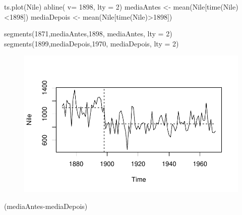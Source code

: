 \documentclass[
  letterpaper,
  DIV=11,
  numbers=noendperiod]{scrartcl}
\newenvironment{Shaded}{\begin{snugshade}}{\end{snugshade}}
\newcommand{\AttributeTok}[1]{\textcolor[rgb]{0.40,0.45,0.13}{#1}}
\newcommand{\DecValTok}[1]{\textcolor[rgb]{0.68,0.00,0.00}{#1}}
\newcommand{\FunctionTok}[1]{\textcolor[rgb]{0.28,0.35,0.67}{#1}}
\newcommand{\NormalTok}[1]{\textcolor[rgb]{0.00,0.23,0.31}{#1}}
\newcommand{\OtherTok}[1]{\textcolor[rgb]{0.00,0.23,0.31}{#1}}
\newcommand{\SpecialCharTok}[1]{\textcolor[rgb]{0.37,0.37,0.37}{#1}}
\theoremstyle{plain}
\theoremstyle{plain}
\theoremstyle{definition}
\theoremstyle{definition}
\theoremstyle{remark}
\begin{document}
\begin{Shaded}
\begin{Highlighting}[]
\FunctionTok{ts.plot}\NormalTok{(Nile)}
\FunctionTok{abline}\NormalTok{( }\AttributeTok{v=} \DecValTok{1898}\NormalTok{, }\AttributeTok{lty =} \DecValTok{2}\NormalTok{)}
\NormalTok{mediaAntes  }\OtherTok{\textless{}{-}} \FunctionTok{mean}\NormalTok{(Nile[}\FunctionTok{time}\NormalTok{(Nile)}\SpecialCharTok{\textless{}}\DecValTok{1898}\NormalTok{])}
\NormalTok{mediaDepois }\OtherTok{\textless{}{-}} \FunctionTok{mean}\NormalTok{(Nile[}\FunctionTok{time}\NormalTok{(Nile)}\SpecialCharTok{\textgreater{}}\DecValTok{1898}\NormalTok{])}
                   
\FunctionTok{segments}\NormalTok{(}\DecValTok{1871}\NormalTok{,mediaAntes,}\DecValTok{1898}\NormalTok{, mediaAntes, }\AttributeTok{lty =} \DecValTok{2}\NormalTok{)}
\FunctionTok{segments}\NormalTok{(}\DecValTok{1899}\NormalTok{,mediaDepois,}\DecValTok{1970}\NormalTok{, mediaDepois, }\AttributeTok{lty =} \DecValTok{2}\NormalTok{)}
\end{Highlighting}
\end{Shaded}

\begin{figure}[H]

{\centering \includegraphics{intervencao_files/figure-pdf/unnamed-chunk-5-1.pdf}

}

\end{figure}

\begin{Shaded}
\begin{Highlighting}[]
\NormalTok{(mediaAntes}\SpecialCharTok{{-}}\NormalTok{mediaDepois)}
\end{Highlighting}
\end{Shaded}
\end{document}
